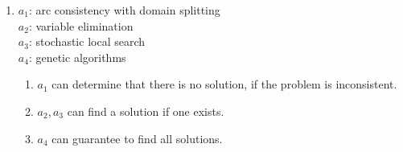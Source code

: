 \documentclass{article}
\begin{document}
\begin{enumerate}
\item
$a_1$: arc consistency with domain splitting \\
$a_2$: variable elimination \\
$a_3$: stochastic local search \\
$a_4$: genetic algorithms

\begin{enumerate}
\item $a_1$ can determine that there is no solution, if the problem is inconsistent.
\item $a_2,a_3$ can find a solution if one exists.
\item $a_4$ can guarantee to find all solutions.
\end{enumerate}



\end{enumerate}
\end{document}

